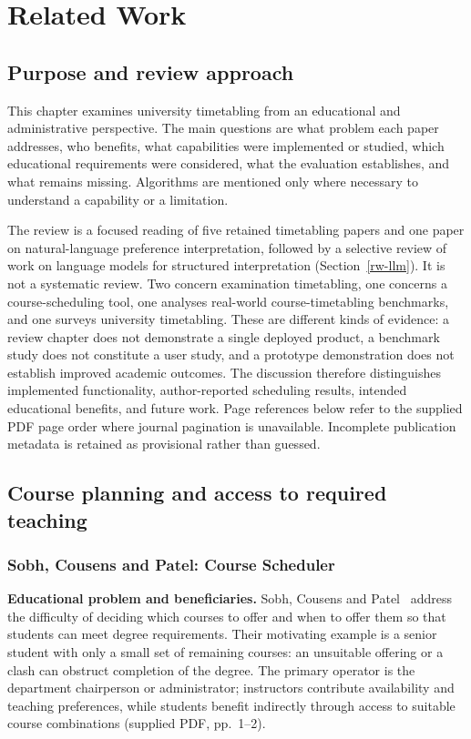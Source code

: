 \chapter{Related Work}\label{literature-review}

\section{Purpose and review approach}
This chapter examines university timetabling from an educational and administrative perspective. The main questions are what problem each paper addresses, who benefits, what capabilities were implemented or studied, which educational requirements were considered, what the evaluation establishes, and what remains missing. Algorithms are mentioned only where necessary to understand a capability or a limitation.

The review is a focused reading of five retained timetabling papers and one paper on natural-language preference interpretation, followed by a selective review of work on language models for structured interpretation (Section~\ref{rw-llm}). It is not a systematic review. Two concern examination timetabling, one concerns a course-scheduling tool, one analyses real-world course-timetabling benchmarks, and one surveys university timetabling. These are different kinds of evidence: a review chapter does not demonstrate a single deployed product, a benchmark study does not constitute a user study, and a prototype demonstration does not establish improved academic outcomes. The discussion therefore distinguishes implemented functionality, author-reported scheduling results, intended educational benefits, and future work. Page references below refer to the supplied PDF page order where journal pagination is unavailable. Incomplete publication metadata is retained as provisional rather than guessed.

\section{Course planning and access to required teaching}
\subsection{Sobh, Cousens and Patel: Course Scheduler}
\textbf{Educational problem and beneficiaries.} Sobh, Cousens and Patel~\cite{sobh_course_scheduler} address the difficulty of deciding which courses to offer and when to offer them so that students can meet degree requirements. Their motivating example is a senior student with only a small set of remaining courses: an unsuitable offering or a clash can obstruct completion of the degree. The primary operator is the department chairperson or administrator; instructors contribute availability and teaching preferences, while students benefit indirectly through access to suitable course combinations (supplied PDF, pp.~1--2).

